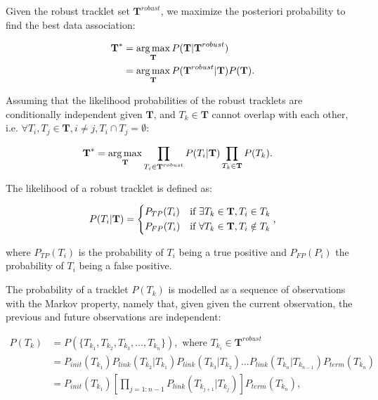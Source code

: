 		Given the robust tracklet set $ \textbf{T}^{robust} $, we maximize the posteriori probability to find the best data association:
		
		\begin{align*}
			\textbf{T}^* &= \operatorname*{arg\,max}_{\textbf{T}} P(\textbf{T} | \textbf{T}^{robust}) \\
			            &= \operatorname*{arg\,max}_{\textbf{T}} P(\textbf{T}^{robust} | \textbf{T} ) P(\textbf{T}) \text{.}
		\end{align*}
				
		Assuming that the likelihood probabilities of the robust tracklets are conditionally independent given $\textbf{T}$, and $ T_k \in \textbf{T}$  cannot overlap with each other, i.e. $ \forall T_i, T_j \in \textbf{T}, i \neq j,  T_i \cap T_j = \emptyset $:
				
		\begin{align*}
			\textbf{T}^* &= \operatorname*{arg\,max}_{\textbf{T}}   \prod_{T_i \in \textbf{T}^{robust}} P(T_i | \textbf{T}) \prod_{T_k \in \textbf{T}} P(T_k) \text{.}
		\end{align*}
		
		The likelihood of a robust tracklet is defined as:
		
		\[
			P(T_i | \textbf{T}) = \begin{dcases}
						   P_{TP}(T_i) & \text{if } \exists T_k \in \textbf{T}, T_i \in T_k \\
						   P_{FP}(T_i) & \text{if } \forall T_k \in \textbf{T}, T_i \notin T_k
						\end{dcases} \text{,}
		\]
  	 	
  	 	\noindent where $ P_{TP}(T_i) $ is the probability of $T_i$ being a true positive and $P_{FP}(P_i) $ the probability of $T_i$ being a false positive.
  	 	
  	 	The probability of a tracklet $P(T_k)$ is modelled as a sequence of observations with the Markov property, namely that, given given the current observation, the previous and future observations are independent:
  	 	
  	 	\begin{align*}
  	 		P(T_k) &= P(\{T_{k_1}, T_{k_2}, T_{k_3}, \dots, T_{k_n}\}), \text{ where } T_{k_i} \in \textbf{T}^{robust} \\
  	 			&= P_{init}(T_{k_1}) P_{link}(T_{k_2}|T_{k_1}) P_{link}(T_{k_3}|T_{k_2}) \dots P_{link}(T_{k_n}|T_{k_{n-1}}) P_{term}(T_{k_n}) \\
  	 			&= P_{init}(T_{k_1}) \left[ \prod_{j=1:{n-1}} P_{link}(T_{k_{j+1}}|T_{k_j}) \right] P_{term}(T_{k_n}) \text{,}
  	 	\end{align*}
  	 	
